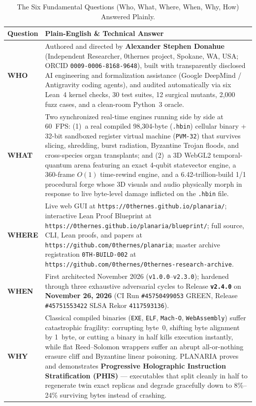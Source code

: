 \documentclass[10pt,letterpaper]{article}
\begin{document}
\begin{table}[ht]
\centering
\caption{The Six Fundamental Questions (Who, What, Where, When, Why, How) Answered Plainly.}
\label{tab:six-w}
\footnotesize
\begin{tabularx}{\textwidth}{@{} L{2.1cm} Y @{}}
\toprule
\textbf{Question} & \textbf{Plain-English \& Technical Answer} \\
\midrule
\textbf{WHO} & Authored and directed by \textbf{Alexander Stephen Donahue} (Independent Researcher, 0thernes project, Spokane, WA, USA; ORCID \texttt{0009-0006-8168-9648}), built with transparently disclosed AI engineering and formalization assistance (Google DeepMind / Antigravity coding agents), and audited automatically via six Lean~4 kernel checks, 30 test suites, 12 surgical mutants, 2,000 fuzz cases, and a clean-room Python~3 oracle. \\
\textbf{WHAT} & Two synchronized real-time engines running side by side at 60~FPS: (1)~a real compiled 98,304-byte (\texttt{.hbin}) cellular binary + 32-bit sandboxed register virtual machine (\texttt{PVM-32}) that survives slicing, shredding, burst radiation, Byzantine Trojan floods, and cross-species organ transplants; and (2)~a 3D WebGL2 temporal-quantum arena featuring an exact 4-qubit statevector engine, a 360-frame $O(1)$ time-rewind engine, and a 6.42-trillion-build 1/1 procedural forge whose 3D visuals and audio physically morph in response to live byte-level damage inflicted on the \texttt{.hbin} file. \\
\textbf{WHERE} & Live web GUI at \nolinkurl{https://0thernes.github.io/planaria/}; interactive Lean Proof Blueprint at \nolinkurl{https://0thernes.github.io/planaria/blueprint/}; full source, CLI, Lean proofs, and papers at \nolinkurl{https://github.com/0thernes/planaria}; master archive registration \texttt{0TH-BUILD-002} at \nolinkurl{https://github.com/0thernes/0thernes-research-archive}. \\
\textbf{WHEN} & First architected November 2026 (\texttt{v1.0.0}--\texttt{v2.3.0}); hardened through three exhaustive adversarial cycles to Release \textbf{\texttt{v2.4.0}} on \textbf{November 26, 2026} (CI Run \texttt{\#45750499053} GREEN, Release \texttt{\#45751553422} SLSA Rekor \texttt{4117593136}). \\
\textbf{WHY} & Classical compiled binaries (\texttt{EXE}, \texttt{ELF}, \texttt{Mach-O}, \texttt{WebAssembly}) suffer catastrophic fragility: corrupting byte~0, shifting byte alignment by 1~byte, or cutting a binary in half kills execution instantly, while flat Reed--Solomon wrappers suffer an abrupt all-or-nothing erasure cliff and Byzantine linear poisoning. PLANARIA proves and demonstrates \textbf{Progressive Holographic Instruction Stratification (PHIS)} --- executables that split cleanly in half to regenerate twin exact replicas and degrade gracefully down to 8\%--24\% surviving bytes instead of crashing. \\

\end{tabularx}
\end{table}
\end{document}
